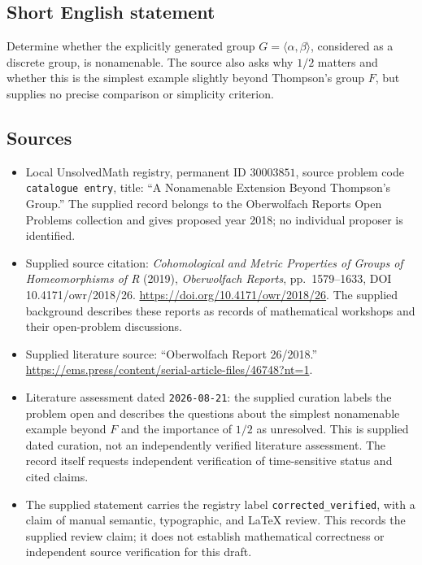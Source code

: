 \documentclass[11pt]{article}
\begin{document}
\subsection{Short English statement}
Determine whether the explicitly generated group \(G=\langle\alpha,\beta\rangle\), considered as a discrete group, is nonamenable. The source also asks why \(1/2\) matters and whether this is the simplest example slightly beyond Thompson's group \(F\), but supplies no precise comparison or simplicity criterion.
\subsection{Sources}
\begin{itemize}
\item Local UnsolvedMath registry, permanent ID \(30003851\), source problem code \texttt{catalogue entry}, title: ``A Nonamenable Extension Beyond Thompson's Group.'' The supplied record belongs to the Oberwolfach Reports Open Problems collection and gives proposed year 2018; no individual proposer is identified.
\item Supplied source citation: \emph{Cohomological and Metric Properties of Groups of Homeomorphisms of R} (2019), \emph{Oberwolfach Reports}, pp.\ 1579--1633, DOI 10.4171/owr/2018/26. \url{https://doi.org/10.4171/owr/2018/26}. The supplied background describes these reports as records of mathematical workshops and their open-problem discussions.
\item Supplied literature source: ``Oberwolfach Report 26/2018.'' \url{https://ems.press/content/serial-article-files/46748?nt=1}.
\item Literature assessment dated \texttt{2026-08-21}: the supplied curation labels the problem open and describes the questions about the simplest nonamenable example beyond \(F\) and the importance of \(1/2\) as unresolved. This is supplied dated curation, not an independently verified literature assessment. The record itself requests independent verification of time-sensitive status and cited claims.
\item The supplied statement carries the registry label \texttt{corrected\_verified}, with a claim of manual semantic, typographic, and LaTeX review. This records the supplied review claim; it does not establish mathematical correctness or independent source verification for this draft.
\end{itemize}
\end{document}
